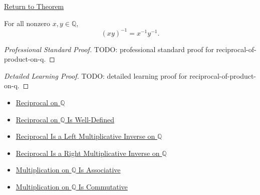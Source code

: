 \newpage
{}
\label{prf:reciprocal-of-product-on-q}

\begin{remark*}[Return]
\hyperref[thm:reciprocal-of-product-on-q]{Return to Theorem}
\end{remark*}

\begin{theorem*}
For all nonzero $x,y\in\mathbb{Q}$,
\[
(xy)^{-1}=x^{-1}y^{-1}.
\]
\end{theorem*}

\begin{proof}[Professional Standard Proof]
\LRAProofBodyStart
TODO: professional standard proof for reciprocal-of-product-on-q.
\end{proof}

\begin{proof}[Detailed Learning Proof]
\LRAProofBodyStart
TODO: detailed learning proof for reciprocal-of-product-on-q.
\end{proof}

\begin{remark*}
\end{remark*}

\begin{dependencies}
\begin{itemize}
  \item \hyperref[def:reciprocal-on-q-classes]{Reciprocal on $\mathbb{Q}$}
  \item \hyperref[thm:reciprocal-on-q-well-defined]{Reciprocal on $\mathbb{Q}$ Is Well-Defined}
  \item \hyperref[thm:reciprocal-left-multiplicative-inverse-on-q]{Reciprocal Is a Left Multiplicative Inverse on $\mathbb{Q}$}
  \item \hyperref[cor:reciprocal-right-multiplicative-inverse-on-q]{Reciprocal Is a Right Multiplicative Inverse on $\mathbb{Q}$}
  \item \hyperref[thm:multiplication-on-q-associative]{Multiplication on $\mathbb{Q}$ Is Associative}
  \item \hyperref[thm:multiplication-on-q-commutative]{Multiplication on $\mathbb{Q}$ Is Commutative}
\end{itemize}
\end{dependencies}

\clearpage
